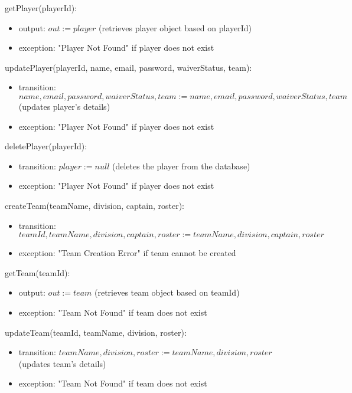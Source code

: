 \documentclass[12pt, titlepage]{article}
\begin{document}
\begin{itemize}
\noindent getPlayer(playerId):
\begin{itemize}
  \item output: $out := player$ (retrieves player object based on playerId)
  \item exception: "Player Not Found" if player does not exist
\end{itemize}

\noindent updatePlayer(playerId, name, email, password, waiverStatus, team):
\begin{itemize}
  \item transition: $name, email, password, waiverStatus, team := name, email, password, waiverStatus, team$ (updates player's details)
  \item exception: "Player Not Found" if player does not exist
\end{itemize}

\noindent deletePlayer(playerId):
\begin{itemize}
  \item transition: $player := null$ (deletes the player from the database)
  \item exception: "Player Not Found" if player does not exist
\end{itemize}

\noindent createTeam(teamName, division, captain, roster):
\begin{itemize}
  \item transition: $teamId, teamName, division, captain, roster := teamName, division, captain, roster$
  \item exception: "Team Creation Error" if team cannot be created
\end{itemize}

\noindent getTeam(teamId):
\begin{itemize}
  \item output: $out := team$ (retrieves team object based on teamId)
  \item exception: "Team Not Found" if team does not exist
\end{itemize}

\noindent updateTeam(teamId, teamName, division, roster):
\begin{itemize}
  \item transition: $teamName, division, roster := teamName, division, roster$ (updates team's details)
  \item exception: "Team Not Found" if team does not exist
\end{itemize}


\end{itemize}
\end{document}
